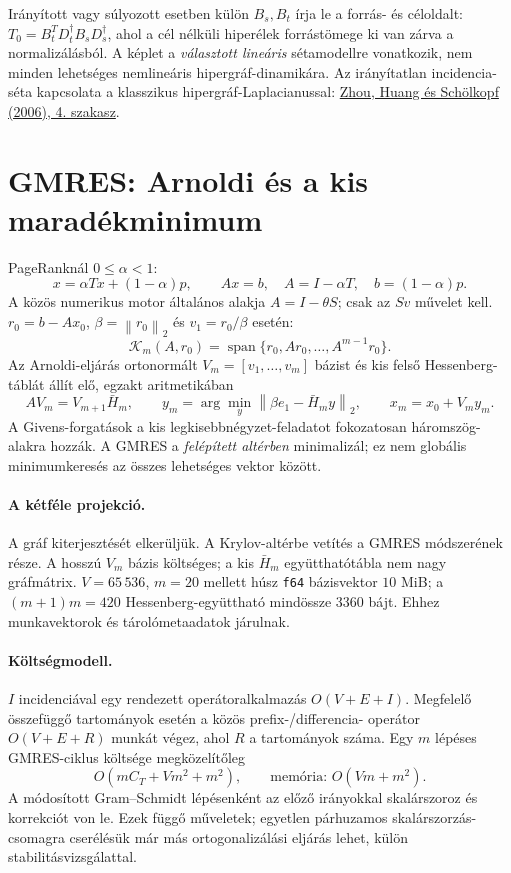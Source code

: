 \documentclass[11pt,a4paper]{article}
\newcommand{\norm}[1]{\left\lVert#1\right\rVert}
\begin{document}
Irányított vagy súlyozott esetben külön $B_s,B_t$ írja le a forrás- és céloldalt:
$T_0=B_t^TD_t^{\dagger}B_sD_s^{\dagger}$, ahol a cél nélküli hiperélek
forrástömege ki van zárva a normalizálásból. A képlet a \emph{választott lineáris}
sétamodellre vonatkozik, nem minden lehetséges nemlineáris hipergráf-dinamikára.
Az irányítatlan incidencia-séta kapcsolata a klasszikus hipergráf-Laplacianussal:
\href{https://papers.nips.cc/paper/2006/file/dff8e9c2ac33381546d96deea9922999-Paper.pdf}{Zhou, Huang és Schölkopf (2006), 4. szakasz}.

\newpage\section{GMRES: Arnoldi és a kis maradékminimum}
PageRanknál $0\leq\alpha<1$:
\[
 x=\alpha Tx+(1-\alpha)p,\qquad A x=b,\quad
 A=I-\alpha T,\quad b=(1-\alpha)p.
\]
A közös numerikus motor általános alakja $A=I-\theta S$; csak az $Sv$ művelet
kell. $r_0=b-Ax_0$, $\beta=\norm{r_0}_2$ és $v_1=r_0/\beta$ esetén:
\[
 \mathcal K_m(A,r_0)=\operatorname{span}\{r_0,Ar_0,\ldots,A^{m-1}r_0\}.
\]
Az Arnoldi-eljárás ortonormált $V_m=[v_1,\ldots,v_m]$ bázist és kis felső
Hessenberg-táblát állít elő, egzakt aritmetikában
\[
 AV_m=V_{m+1}\bar H_m,\qquad
 y_m=\arg\min_y\norm{\beta e_1-\bar H_m y}_2,\qquad x_m=x_0+V_m y_m.
\]
A Givens-forgatások a kis legkisebbnégyzet-feladatot fokozatosan háromszög-alakra
hozzák. A GMRES a \emph{felépített altérben} minimalizál; ez nem globális
minimumkeresés az összes lehetséges vektor között.

\paragraph{A kétféle projekció.} A gráf kiterjesztését elkerüljük. A Krylov-altérbe
vetítés a GMRES módszerének része. A hosszú $V_m$ bázis költséges; a kis
$\bar H_m$ együtthatótábla nem nagy gráfmátrix. $V=65\,536$, $m=20$ mellett
húsz \texttt{f64} bázisvektor $10$ MiB; a $(m+1)m=420$ Hessenberg-együttható
mindössze $3360$ bájt. Ehhez munkavektorok és tárolómetaadatok járulnak.

\paragraph{Költségmodell.} $I$ incidenciával egy rendezett operátoralkalmazás
$O(V+E+I)$. Megfelelő összefüggő tartományok esetén a közös prefix-/differencia-
operátor $O(V+E+R)$ munkát végez, ahol $R$ a tartományok száma.
Egy $m$ lépéses GMRES-ciklus költsége megközelítőleg
\[
 O(m C_T+Vm^2+m^2),\qquad \text{memória: }O(Vm+m^2).
\]
A módosított Gram--Schmidt lépésenként az előző irányokkal skalárszoroz és
korrekciót von le. Ezek függő műveletek; egyetlen párhuzamos skalárszorzás-csomagra
cserélésük már más ortogonalizálási eljárás lehet, külön stabilitásvizsgálattal.
\end{document}

